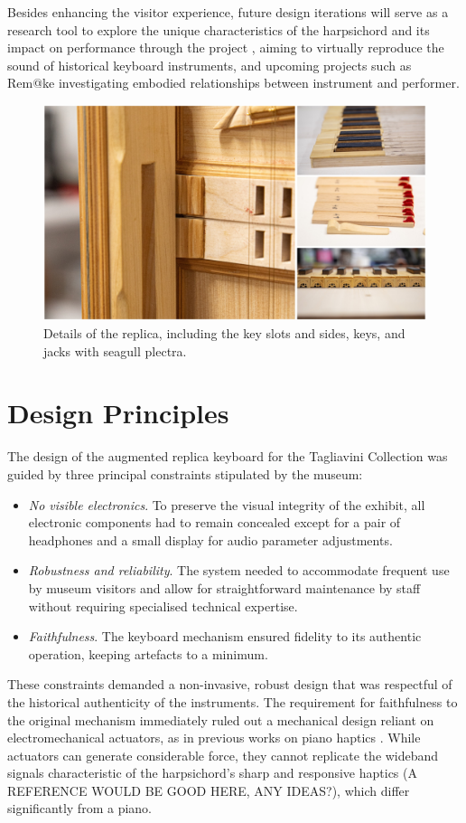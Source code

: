 Besides enhancing the visitor experience, future design iterations will serve as a research tool to explore the unique characteristics of the harpsichord and its impact on performance through the  project \cite{NEMUS}, aiming to virtually reproduce the sound of historical keyboard instruments, and upcoming projects such as Rem@ke \cite{remake1} investigating embodied relationships between instrument and performer.

\begin{figure}
\centering
\includegraphics[width=0.8\linewidth]{src/images/details.jpg}
\caption{Details of the replica, including the key slots and sides, keys, and jacks with seagull plectra.}\label{fig:details}
\end{figure}

\section{Design Principles}\label{design}

The design of the augmented replica keyboard for the Tagliavini Collection was guided by three principal constraints stipulated by the museum:
\begin{itemize}
\item \emph{No visible electronics}. To preserve the visual integrity of the exhibit, all electronic components had to remain concealed except for a pair of headphones and a small display for audio parameter adjustments.
\item \emph{Robustness and reliability}. The system needed to accommodate frequent use by museum visitors and allow for straightforward maintenance by staff without requiring specialised technical expertise.
\item \emph{Faithfulness}. The keyboard mechanism ensured fidelity to its authentic operation, keeping artefacts to a minimum. 
\end{itemize}
These constraints demanded a non-invasive, robust design that was respectful of the historical authenticity of the instruments. The requirement for faithfulness to the original mechanism immediately ruled out a mechanical design reliant on electromechanical actuators, as in previous works on piano haptics \cite{Timmermans2020,Gillespie1996}. While actuators can generate considerable force, they cannot replicate the wideband signals characteristic of the harpsichord's sharp and responsive haptics (A REFERENCE WOULD BE GOOD HERE, ANY IDEAS?), which differ significantly from a piano.

